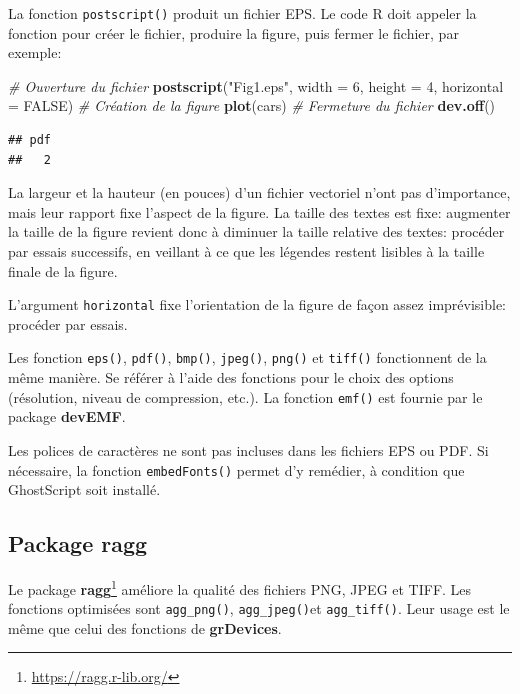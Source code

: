 \documentclass[
  12pt,
  french,
  a4paper,
  extrafontsizes,onecolumn,openright
  ]{memoir}
\newenvironment{Shaded}{\begin{snugshade}}{\end{snugshade}}
\newcommand{\CommentTok}[1]{\textcolor[rgb]{0.56,0.35,0.01}{\textit{#1}}}
\newcommand{\DataTypeTok}[1]{\textcolor[rgb]{0.13,0.29,0.53}{#1}}
\newcommand{\DecValTok}[1]{\textcolor[rgb]{0.00,0.00,0.81}{#1}}
\newcommand{\KeywordTok}[1]{\textcolor[rgb]{0.13,0.29,0.53}{\textbf{#1}}}
\newcommand{\NormalTok}[1]{#1}
\newcommand{\OtherTok}[1]{\textcolor[rgb]{0.56,0.35,0.01}{#1}}
\newcommand{\StringTok}[1]{\textcolor[rgb]{0.31,0.60,0.02}{#1}}
\begin{document}
La fonction \texttt{postscript()} produit un fichier EPS.
Le code R doit appeler la fonction pour créer le fichier, produire la figure, puis fermer le fichier, par exemple:

\scriptsize

\begin{Shaded}
\begin{Highlighting}[]
\CommentTok{# Ouverture du fichier}
\KeywordTok{postscript}\NormalTok{(}\StringTok{"Fig1.eps"}\NormalTok{, }\DataTypeTok{width =} \DecValTok{6}\NormalTok{, }\DataTypeTok{height =} \DecValTok{4}\NormalTok{, }\DataTypeTok{horizontal =} \OtherTok{FALSE}\NormalTok{)}
\CommentTok{# Création de la figure}
\KeywordTok{plot}\NormalTok{(cars)}
\CommentTok{# Fermeture du fichier}
\KeywordTok{dev.off}\NormalTok{()}
\end{Highlighting}
\end{Shaded}

\begin{verbatim}
## pdf 
##   2
\end{verbatim}

\normalsize

La largeur et la hauteur (en pouces) d'un fichier vectoriel n'ont pas d'importance, mais leur rapport fixe l'aspect de la figure.
La taille des textes est fixe: augmenter la taille de la figure revient donc à diminuer la taille relative des textes: procéder par essais successifs, en veillant à ce que les légendes restent lisibles à la taille finale de la figure.

L'argument \texttt{horizontal} fixe l'orientation de la figure de façon assez imprévisible: procéder par essais.

Les fonction \texttt{eps()}, \texttt{pdf()}, \texttt{bmp()}, \texttt{jpeg()}, \texttt{png()} et \texttt{tiff()} fonctionnent de la même manière.
Se référer à l'aide des fonctions pour le choix des options (résolution, niveau de compression, etc.).
La fonction \texttt{emf()} est fournie par le package \textbf{devEMF}.

Les polices de caractères ne sont pas incluses dans les fichiers EPS ou PDF.
Si nécessaire, la fonction \texttt{embedFonts()} permet d'y remédier, à condition que GhostScript soit installé.

\hypertarget{package-ragg}{%
\subsection{Package ragg}\label{package-ragg}}

Le package \textbf{ragg}\footnote{\url{https://ragg.r-lib.org/}} améliore la qualité des fichiers PNG, JPEG et TIFF.
Les fonctions optimisées sont \texttt{agg\_png()}, \texttt{agg\_jpeg()}et \texttt{agg\_tiff()}. Leur usage est le même que celui des fonctions de \textbf{grDevices}.
\end{document}
